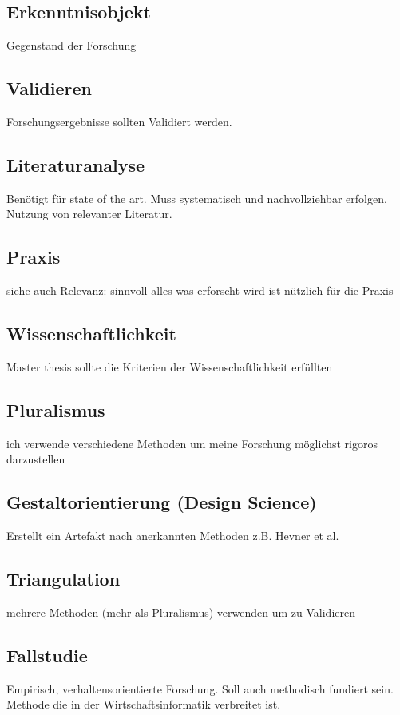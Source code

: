 \documentclass[DIV=calc, paper=a4, fontsize=11pt, twocolumn]{scrartcl}	 %
\begin{document}
\subsection*{Erkenntnisobjekt}
Gegenstand der Forschung

\subsection*{Validieren}
Forschungsergebnisse sollten Validiert werden.

\subsection*{Literaturanalyse}
Ben\"otigt f\"ur state of the art. Muss systematisch und nachvollziehbar erfolgen. Nutzung von relevanter Literatur.

\subsection*{Praxis}
siehe auch Relevanz: sinnvoll alles was erforscht wird ist n\"utzlich f\"ur die Praxis

\subsection*{Wissenschaftlichkeit}
Master thesis sollte die Kriterien der Wissenschaftlichkeit erf\"ullten

\subsection*{Pluralismus}
ich verwende verschiedene Methoden um meine Forschung m\"oglichst rigoros darzustellen

\subsection*{Gestaltorientierung (Design Science)}
Erstellt ein Artefakt nach anerkannten Methoden z.B. Hevner et al.
\subsection*{Triangulation}
mehrere Methoden (mehr als Pluralismus) verwenden um zu Validieren

\subsection*{Fallstudie}
Empirisch, verhaltensorientierte Forschung. Soll auch methodisch fundiert sein. Methode die in der Wirtschaftsinformatik verbreitet ist.
\end{document}
